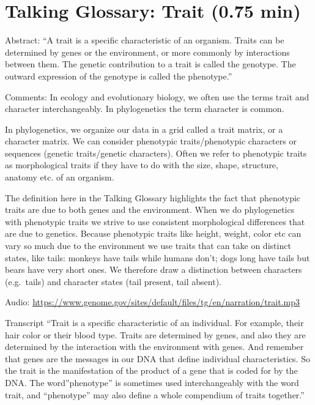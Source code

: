 \documentclass[
]{book}
\begin{document}
\hypertarget{talking-glossary-trait-0.75-min}{%
\section{Talking Glossary: Trait (0.75 min)}\label{talking-glossary-trait-0.75-min}}

Abstract: ``A trait is a specific characteristic of an organism. Traits can be determined by genes or the environment, or more commonly by interactions between them. The genetic contribution to a trait is called the genotype. The outward expression of the genotype is called the phenotype.''

Comments:
In ecology and evolutionary biology, we often use the terms trait and character interchangeably. In phylogenetics the term character is common.

In phylogenetics, we organize our data in a grid called a trait matrix, or a character matrix. We can consider phenotypic traits/phenotypic characters or sequences (genetic traits/genetic characters). Often we refer to phenotypic traits as morphological traits if they have to do with the size, shape, structure, anatomy etc. of an organism.

The definition here in the Talking Glossary highlights the fact that phenotypic traits are due to both genes and the environment. When we do phylogenetics with phenotypic traits we strive to use consistent morphological differences that are due to genetics. Because phenotypic traits like height, weight, color etc can vary so much due to the environment we use traits that can take on distinct states, like tails: monkeys have tails while humans don't; dogs long have tails but bears have very short ones. We therefore draw a distinction between characters (e.g.~tails) and character states (tail present, tail absent).

Audio: \url{https://www.genome.gov/sites/default/files/tg/en/narration/trait.mp3}

Transcript
``Trait is a specific characteristic of an individual. For example, their hair color or their blood type. Traits are determined by genes, and also they are determined by the interaction with the environment with genes. And remember that genes are the messages in our DNA that define individual characteristics. So the trait is the manifestation of the product of a gene that is coded for by the DNA. The word''phenotype'' is sometimes used interchangeably with the word trait, and ``phenotype'' may also define a whole compendium of traits together.''
\end{document}
